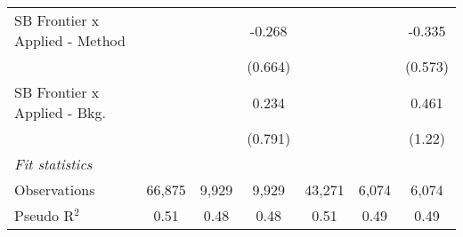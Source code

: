 \begin{tabular}{lcccccc}
   SB Frontier x Applied - Method &             &              & -0.268        &              &         & -0.335\\   
                                  &             &              & (0.664)       &              &         & (0.573)\\   
   SB Frontier x Applied - Bkg.   &             &              & 0.234         &              &         & 0.461\\   
                                  &             &              & (0.791)       &              &         & (1.22)\\   
   \midrule
   \emph{Fit statistics}\\
   Observations                   & 66,875      & 9,929        & 9,929         & 43,271       & 6,074   & 6,074\\  
   Pseudo R$^2$                   & 0.51        & 0.48         & 0.48          & 0.51         & 0.49    & 0.49\\  
   

\end{tabular}
